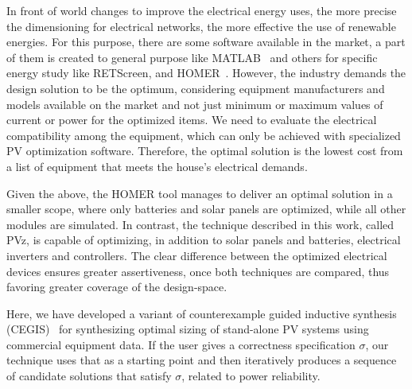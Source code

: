 \documentclass[10pt,journal,compsoc]{IEEEtran}
\begin{document}
In front of world changes to improve the electrical energy uses, the more precise the dimensioning for electrical networks, the more effective the use of renewable energies. For this purpose, there are some software available in the market, a part of them is created to general purpose like MATLAB~\cite{Benatiallah2017} and others for specific energy study like RETScreen, and HOMER~\cite{Pradhan,Swarnkar}. However, the
industry demands the design solution to be the optimum, considering equipment manufacturers and models available on the market and not just minimum or maximum
values of current or power for the optimized items. We need to evaluate the electrical compatibility among the equipment, which can only be achieved with specialized PV optimization software. Therefore, the optimal solution is the lowest cost from a list of equipment that meets the house’s electrical demands.

Given the above, the HOMER tool manages to deliver an optimal solution in a smaller scope, where only batteries and solar panels are optimized, while all other modules are simulated. In contrast, the technique described in this work, called PVz, is capable of optimizing, in addition to solar panels and batteries, electrical inverters and controllers. The clear difference between the optimized electrical devices ensures greater assertiveness, once both techniques are compared, thus favoring greater coverage of the design-space.
\color{black}

Here, we have developed a variant of counterexample guided inductive synthesis (CEGIS)~\cite{AbateCAV2018} for synthesizing optimal sizing of stand-alone PV systems using commercial equipment data. If the user gives a correctness specification $\sigma$, our technique uses that as a starting point and then iteratively produces a sequence of candidate solutions that satisfy $\sigma$, related to power reliability.
\end{document}
